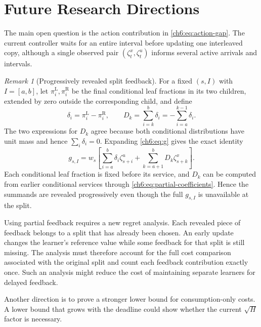 \documentclass[11pt]{article}
\theoremstyle{plain}
\theoremstyle{remark}
\newtheorem{Thm:Remark}[Thm:Theorem]{Remark}
\numberwithin{equation}{section}
\begin{document}
\section{Future Research Directions}
\label{ch6:sec:next}
The main open question is the action contribution in
\eqref{ch6:eq:action-gap}. The current controller waits for an entire
interval before updating one interleaved copy, although a single observed
pair $(\zeta_t^x,\zeta_t^u)$ informs several active arrivals and intervals.

\begin{Thm:Remark}[Progressively revealed split feedback]
For a fixed $(s,I)$ with $I=[a,b]$, let $\pi^{\mathrm{L}}_i,\pi^{\mathrm{R}}_i$ be the final
conditional leaf fractions in its two children, extended by zero outside
the corresponding child, and define
\begin{equation}\label{ch6:eq:partial-coefficients}
 \delta_i=\pi^{\mathrm{L}}_i-\pi^{\mathrm{R}}_i,\qquad
 D_k=\sum_{i=k}^b\delta_i=-\sum_{i=a}^{k-1}\delta_i.
\end{equation}
The two expressions for $D_k$ agree because both conditional distributions
have unit mass and hence $\sum_i\delta_i=0$.
Expanding \eqref{ch6:eq:g} gives the exact identity
\begin{equation}\label{ch6:eq:partial}
 \boxed{g_{s,I}=w_s\left[
 \sum_{i=a}^b\delta_i\zeta_{s+i}^u
 +\sum_{k=a+1}^bD_k\zeta_{s+k}^x\right].}
\end{equation}
Each conditional leaf fraction is fixed before its service, and $D_k$ can
be computed from earlier conditional services through
\eqref{ch6:eq:partial-coefficients}. Hence the summands are revealed
progressively even though the full $g_{s,I}$ is unavailable at the split.
\end{Thm:Remark}

Using partial feedback requires a new regret analysis. Each revealed
piece of feedback belongs to a split that has already been chosen. An
early update changes the learner's reference value while some feedback
for that split is still missing. The analysis must therefore account for
the full cost comparison associated with the original split and count
each feedback contribution exactly once. Such an analysis might reduce
the cost of maintaining separate learners for delayed feedback.

Another direction is to prove a stronger lower bound for consumption-only
costs. A lower bound that grows with the deadline could show whether the
current $\sqrt{H}$ factor is necessary.
\end{document}
